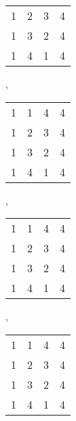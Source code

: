 \documentclass{beamer}
\begin{document}
\begin{frame}
\begin{center}
\begin{tabular}{@{}c@{}c@{}c@{}c@{}}
\color{lgr}1&\color{lgr}2&\color{lgr}3&\color{lgr}4\\
\color{lgr}1&\color{lgr}3&\color{lgr}2&\color{lgr}4\\
1&\color{lgr}4&\color{lgr}1&4\\
\end{tabular},\ \ \ 
\begin{tabular}{@{}c@{}c@{}c@{}c@{}}
1&\color{lgr}1&\color{lgr}4&\color{lgr}4\\
\color{lgr}1&\color{lgr}2&\color{lgr}3&\color{lgr}4\\
\color{lgr}1&\color{lgr}3&\color{lgr}2&\color{lgr}4\\
\color{lgr}1&\color{lgr}4&\color{lgr}1&\color{lgr}4\\
\end{tabular},\ \ \ 
\begin{tabular}{@{}c@{}c@{}c@{}c@{}}
\color{lgr}1&\color{lgr}1&\color{lgr}4&\color{lgr}4\\
\color{lgr}1&2&3&\color{lgr}4\\
\color{lgr}1&3&2&\color{lgr}4\\
\color{lgr}1&\color{lgr}4&\color{lgr}1&\color{lgr}4\\
\end{tabular},\ \ \ 
\begin{tabular}{@{}c@{}c@{}c@{}c@{}}
\color{lgr}1&\color{lgr}1&\color{lgr}4&\color{lgr}4\\
\color{lgr}1&2&\color{lgr}3&\color{lgr}4\\
\color{lgr}1&\color{lgr}3&\color{lgr}2&\color{lgr}4\\
\color{lgr}1&\color{lgr}4&\color{lgr}1&\color{lgr}4\\
\end{tabular}
\end{center}


\begin{tikzpicture}[scale=.6,>=latex',line join=bevel,]


\end{tikzpicture}
\end{frame}
\end{document}
